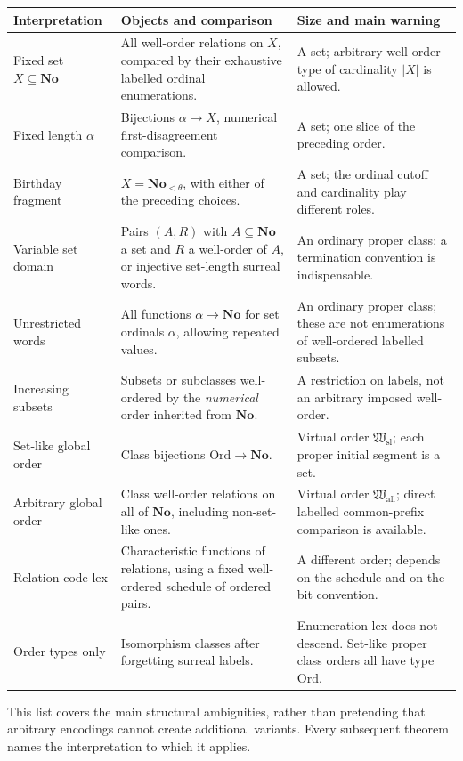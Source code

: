 \documentclass[11pt]{article}
\theoremstyle{definition}
\theoremstyle{remark}
\newcommand{\No}{\mathbf{No}}
\newcommand{\Ord}{\mathrm{Ord}}
\newcommand{\Hsl}{\mathfrak W_{\mathrm{sl}}}
\newcommand{\Hall}{\mathfrak W_{\mathrm{all}}}
\begin{document}
\begin{longtable}{@{}>{\raggedright\arraybackslash}p{}>{\raggedright\arraybackslash}p{}>{\raggedright\arraybackslash}p{}@{}}
\toprule
Interpretation & Objects and comparison & Size and main warning\\
\midrule\endhead
Fixed set $X\subseteq\No$ & All well-order relations on $X$, compared
by their exhaustive labelled ordinal enumerations. & A set; arbitrary
well-order type of cardinality $|X|$ is allowed.\\
Fixed length $\alpha$ & Bijections $\alpha\to X$, numerical
first-disagreement comparison. & A set; one slice of the preceding order.\\
Birthday fragment & $X=\No_{<\theta}$, with either of the preceding
choices. & A set; the ordinal cutoff and cardinality play different roles.\\
Variable set domain & Pairs $(A,R)$ with $A\subseteq\No$ a set and $R$
a well-order of $A$, or injective set-length surreal words. & An ordinary
proper class; a termination convention is indispensable.\\
Unrestricted words & All functions $\alpha\to\No$ for set ordinals
$\alpha$, allowing repeated values. & An ordinary proper class; these are
not enumerations of well-ordered labelled subsets.\\
Increasing subsets & Subsets or subclasses well-ordered by the
\emph{numerical} order inherited from $\No$. & A restriction on labels,
not an arbitrary imposed well-order.\\
Set-like global order & Class bijections $\Ord\to\No$. & Virtual order
$\Hsl$; each proper initial segment is a set.\\
Arbitrary global order & Class well-order relations on all of $\No$,
including non-set-like ones. & Virtual order $\Hall$; direct labelled
common-prefix comparison is available.\\
Relation-code lex & Characteristic functions of relations, using a fixed
well-ordered schedule of ordered pairs. & A different order; depends on
the schedule and on the bit convention.\\
Order types only & Isomorphism classes after forgetting surreal labels. &
Enumeration lex does not descend. Set-like proper class orders all have
type $\Ord$.\\
\bottomrule
\end{longtable}

This list covers the main structural ambiguities, rather than pretending
that arbitrary encodings cannot create additional variants. Every
subsequent theorem names the interpretation to which it applies.
\end{document}
